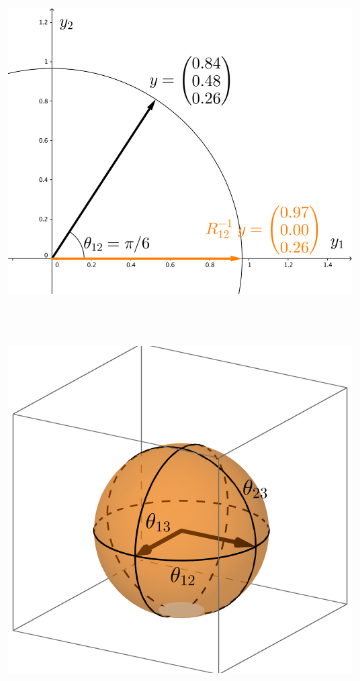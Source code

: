 \documentclass{article}
\begin{document}
\begin{figure}
    \centering
    \begin{subfigure}[b]{0.3\textwidth}
        \includegraphics[width=\textwidth]{GivensReduction.png}
        \caption{}
        \label{fig:GivensReduction}
    \end{subfigure}
    ~ %
    \begin{subfigure}[b]{0.3\textwidth}
        \includegraphics[width=\textwidth]{StiefelGeom.png}

\end{subfigure}
\end{figure}
\end{document}
